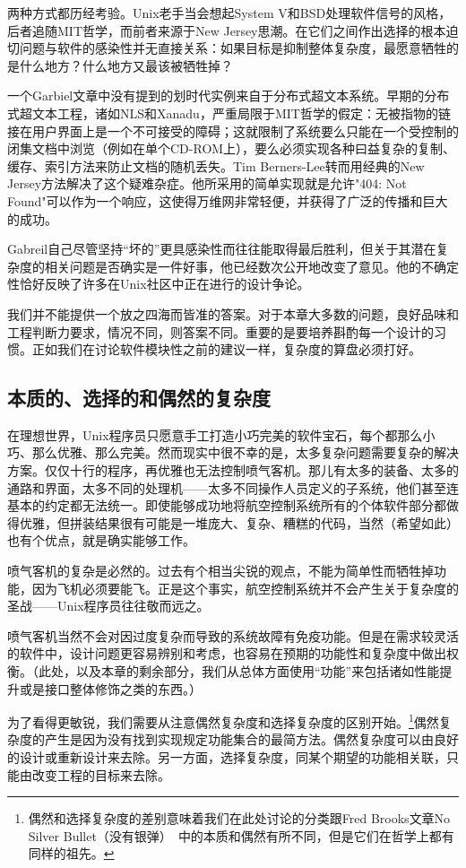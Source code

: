 \documentclass[12pt,oneside]{ctexbook}
\begin{document}
\begin{common-format}
两种方式都历经考验。Unix老手当会想起System V和BSD处理软件信号的风格，后者追随MIT哲学，而前者来源于New Jersey思潮。在它们之间作出选择的根本迫切问题与软件的感染性并无直接关系：如果目标是抑制整体复杂度，最愿意牺牲的是什么地方？什么地方又最该被牺牲掉？

一个Garbiel文章中没有提到的划时代实例来自于分布式超文本系统。早期的分布式超文本工程，诸如NLS和Xanadu，严重局限于MIT哲学的假定：无被指物的链接在用户界面上是一个不可接受的障碍；这就限制了系统要么只能在一个受控制的闭集文档中浏览（例如在单个CD-ROM上），要么必须实现各种曰益复杂的复制、缓存、索引方法来防止文档的随机丢失。Tim Berners-Lee转而用经典的New Jersey方法解决了这个疑难杂症。他所采用的简单实现就是允许"404: Not Found"可以作为一个响应，这使得万维网非常轻便，并获得了广泛的传播和巨大的成功。

Gabreil自己尽管坚持“坏的”更具感染性而往往能取得最后胜利，但关于其潜在复杂度的相关问题是否确实是一件好事，他已经数次公开地改变了意见。他的不确定性恰好反映了许多在Unix社区中正在进行的设计争论。

我们并不能提供一个放之四海而皆准的答案。对于本章大多数的问题，良好品味和工程判断力要求，情况不同，则答案不同。重要的是要培养斟酌每一个设计的习惯。正如我们在讨论软件模块性之前的建议一样，复杂度的算盘必须打好。

\subsection{本质的、选择的和偶然的复杂度}
在理想世界，Unix程序员只愿意手工打造小巧完美的软件宝石，每个都那么小巧、那么优雅、那么完美。然而现实中很不幸的是，太多复杂问题需要复杂的解决方案。仅仅十行的程序，再优雅也无法控制喷气客机。那儿有太多的装备、太多的通路和界面，太多不同的处理机——太多不同操作人员定义的子系统，他们甚至连基本的约定都无法统一。即使能够成功地将航空控制系统所有的个体软件部分都做得优雅，但拼装结果很有可能是一堆庞大、复杂、糟糕的代码，当然（希望如此）也有个优点，就是确实能够工作。

喷气客机的复杂是必然的。过去有个相当尖锐的观点，不能为简单性而牺牲掉功能，因为飞机必须要能飞。正是这个事实，航空控制系统并不会产生关于复杂度的圣战——Unix程序员往往敬而远之。

喷气客机当然不会对因过度复杂而导致的系统故障有免疫功能。但是在需求较灵活的软件中，设计问题更容易辨别和考虑，也容易在预期的功能性和复杂度中做出权衡。（此处，以及本章的剩余部分，我们从总体方面使用“功能”来包括诸如性能提升或是接口整体修饰之类的东西。）

为了看得更敏锐，我们需要从注意偶然复杂度和选择复杂度的区别开始。\footnote{偶然和选择复杂度的差别意味着我们在此处讨论的分类跟Fred Brooks文章No Silver Bullet（没有银弹）~\cite{Brooks}中的本质和偶然有所不同，但是它们在哲学上都有同样的祖先。}偶然复杂度的产生是因为没有找到实现规定功能集合的最简方法。偶然复杂度可以由良好的设计或重新设计来去除。另一方面，选择复杂度，同某个期望的功能相关联，只能由改变工程的目标来去除。


\end{common-format}
\end{document}
